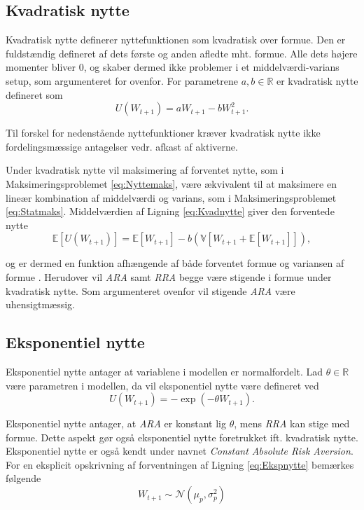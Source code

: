 \documentclass[
  a4paper,
  oneside]{memoir}
\begin{document}
\hypertarget{kvadratisk-nytte}{%
\subsection{Kvadratisk nytte}\label{kvadratisk-nytte}}

Kvadratisk nytte definerer nyttefunktionen som kvadratisk over formue. Den er fuldstændig defineret af dets første og anden afledte mht. formue. Alle dets højere momenter bliver \(0\), og skaber dermed ikke problemer i et middelværdi-varians setup, som argumenteret for ovenfor. For parametrene \(a,b\in\mathbb{R}\) er kvadratisk nytte defineret som
\begin{equation}
U(W_{t+1})=aW_{t+1}-bW_{t+1}^2. \label{eq:Kvadnytte}
\end{equation}

Til forskel for nedenstående nyttefunktioner kræver kvadratisk nytte ikke fordelingsmæssige antagelser vedr. afkast af aktiverne.

Under kvadratisk nytte vil maksimering af forventet nytte, som i Maksimeringsproblemet \eqref{eq:Nyttemaks}, være ækvivalent til at maksimere en lineær kombination af middelværdi og varians, som i Maksimeringsproblemet \eqref{eq:Statmaks}. Middelværdien af Ligning \eqref{eq:Kvadnytte} giver den forventede nytte
\[\mathbb{E}[U(W_{t+1})]=\mathbb{E}[W_{t+1}]-b(\mathbb{V}[W_{t+1}+\mathbb{E}[W_{t+1}]]),\]

og er dermed en funktion afhængende af både forventet formue og variansen af formue \citep{Munk2017}. Herudover vil \emph{ARA} samt \emph{RRA} begge være stigende i formue under kvadratisk nytte. Som argumenteret ovenfor vil stigende \emph{ARA} være uhensigtmæssig.

\hypertarget{eksponentiel-nytte}{%
\subsection{Eksponentiel nytte}\label{eksponentiel-nytte}}

Eksponentiel nytte antager at variablene i modellen er normalfordelt. Lad \(\theta\in\mathbb{R}\) være parametren i modellen, da vil eksponentiel nytte være defineret ved
\begin{equation}
U(W_{t+1})=-\exp\left(-\theta W_{t+1}\right). \label{eq:Ekspnytte}
\end{equation}

Eksponentiel nytte antager, at \emph{ARA} er konstant lig \(\theta\), mens \emph{RRA} kan stige med formue. Dette aspekt gør også eksponentiel nytte foretrukket ift. kvadratisk nytte. Eksponentiel nytte er også kendt under navnet \emph{Constant Absolute Risk Aversion}. For en eksplicit opskrivning af forventningen af Ligning \eqref{eq:Ekspnytte} bemærkes følgende
\[W_{t+1}\sim \mathcal{N}\left(\mu_p,\sigma_p^2\right)\]
\end{document}

